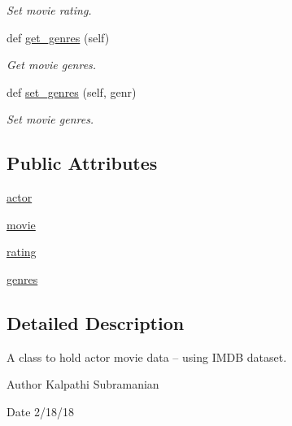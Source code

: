 \begin{DoxyCompactItemize}
\begin{DoxyCompactList}\small\item\em Set movie rating. \end{DoxyCompactList}\item 
def \hyperlink{class_bridges_1_1data__src__dependent_1_1actor__movie__imdb_1_1_actor_movie_i_m_d_b_a8a3a78899c05f5ed57fca9efe1dfee22}{get\+\_\+genres} (self)
\begin{DoxyCompactList}\small\item\em Get movie genres. \end{DoxyCompactList}\item 
def \hyperlink{class_bridges_1_1data__src__dependent_1_1actor__movie__imdb_1_1_actor_movie_i_m_d_b_aa0967f0ace8299ef5b2b59c90d62f053}{set\+\_\+genres} (self, genr)
\begin{DoxyCompactList}\small\item\em Set movie genres. \end{DoxyCompactList}\end{DoxyCompactItemize}
\subsection*{Public Attributes}
\begin{DoxyCompactItemize}
\item 
\hyperlink{class_bridges_1_1data__src__dependent_1_1actor__movie__imdb_1_1_actor_movie_i_m_d_b_a6eef2ee3d18703f260a800f9612008dc}{actor}
\item 
\hyperlink{class_bridges_1_1data__src__dependent_1_1actor__movie__imdb_1_1_actor_movie_i_m_d_b_a5661f3355662942db75f5290215006b1}{movie}
\item 
\hyperlink{class_bridges_1_1data__src__dependent_1_1actor__movie__imdb_1_1_actor_movie_i_m_d_b_a1b8c314c6e30c9f7f342e476c0f8173a}{rating}
\item 
\hyperlink{class_bridges_1_1data__src__dependent_1_1actor__movie__imdb_1_1_actor_movie_i_m_d_b_ad97db2d5c33e02f7e8c77925f326aa67}{genres}
\end{DoxyCompactItemize}


\subsection{Detailed Description}
A class to hold actor movie data -- using I\+M\+D\+B dataset. 

\begin{DoxyAuthor}{Author}
Kalpathi Subramanian 
\end{DoxyAuthor}
\begin{DoxyDate}{Date}
2/18/18 
\end{DoxyDate}


